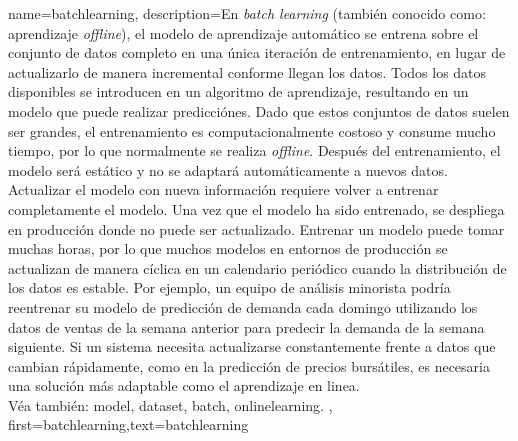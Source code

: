 {name={batchlearning},
description={En \emph{batch learning} (también conocido como: aprendizaje \emph{offline}), el modelo de aprendizaje automático se entrena sobre el conjunto de datos completo en una única iteración de entrenamiento, en lugar de actualizarlo de manera incremental conforme llegan los datos. Todos los datos disponibles se introducen en un algoritmo de aprendizaje, resultando en un modelo que puede realizar predicciónes. Dado que estos conjuntos de datos suelen ser grandes,
el entrenamiento es computacionalmente costoso y consume mucho tiempo, por lo que normalmente se realiza \emph{offline}. Después del entrenamiento, el modelo será estático y no se adaptará automáticamente a nuevos datos. Actualizar el modelo con nueva información requiere volver a entrenar completamente el modelo. Una vez que el modelo ha sido entrenado, se despliega en producción donde no puede ser actualizado. 
Entrenar un modelo puede tomar muchas horas, por lo que muchos modelos en entornos de producción se actualizan de manera cíclica en un calendario periódico cuando la distribución de los datos es estable. Por ejemplo, un equipo de análisis minorista podría reentrenar su modelo de predicción de demanda cada domingo utilizando los datos de ventas de la semana anterior para predecir la demanda de la semana siguiente. 
Si un sistema necesita actualizarse constantemente frente a datos que cambian rápidamente, como en la predicción de precios bursátiles, es necesaria una solución más adaptable como el aprendizaje en linea.\\
Véa también: \gls{model}, \gls{dataset}, \gls{batch}, \gls{onlinelearning}. },
	first={batchlearning},text={batchlearning}
}



